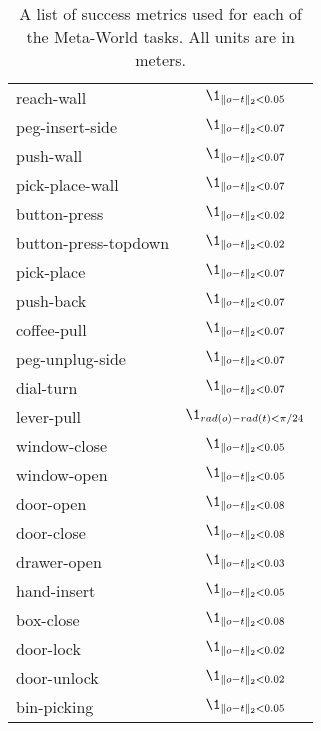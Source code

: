 \begin{table}[h]
\begin{tabular}{lc}
reach-wall & $\1_{\|o - t\|_2 < 0.05}$\\
peg-insert-side & $\1_{\|o - t\|_2 < 0.07}$\\
push-wall & $\1_{\|o - t\|_2 < 0.07}$\\
pick-place-wall & $\1_{\|o - t\|_2 < 0.07}$\\
button-press & $\1_{\|o - t\|_2 < 0.02}$\\
button-press-topdown & $\1_{\|o - t\|_2 < 0.02}$\\
pick-place & $\1_{\|o - t\|_2 < 0.07}$\\
push-back & $\1_{\|o - t\|_2 < 0.07}$\\
coffee-pull & $\1_{\|o - t\|_2 < 0.07}$\\
peg-unplug-side & $\1_{\|o - t\|_2 < 0.07}$\\
dial-turn & $\1_{\|o - t\|_2 < 0.07}$\\
lever-pull & $\1_{rad(o) - rad(t) < \pi / 24}$\\
window-close & $\1_{\|o - t\|_2 < 0.05}$\\
window-open & $\1_{\|o - t\|_2 < 0.05}$\\
door-open & $\1_{\|o - t\|_2 < 0.08}$\\
door-close & $\1_{\|o - t\|_2 < 0.08}$\\
drawer-open & $\1_{\|o - t\|_2 < 0.03}$\\
hand-insert & $\1_{\|o - t\|_2 < 0.05}$\\
box-close & $\1_{\|o - t\|_2 < 0.08}$\\
door-lock & $\1_{\|o - t\|_2 < 0.02}$\\
door-unlock & $\1_{\|o - t\|_2 < 0.02}$\\
bin-picking & $\1_{\|o - t\|_2 < 0.05}$\\
\bottomrule
\end{tabular}
\vspace{0.2cm}
    \caption{A list of success metrics used for each of the Meta-World tasks. All units are in meters.}
    \label{tbl:task_metrics}
\end{table}


